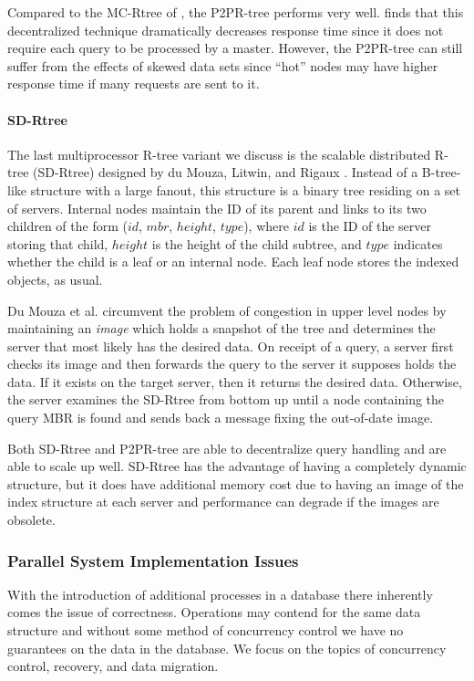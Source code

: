 Compared to the MC-Rtree of \cite{schnitzer1999master}, the P2PR-tree performs
very well. \cite{mondal2005p2pr} finds that this decentralized technique 
dramatically decreases response time since it does
not require each query to be processed by a master. However, the P2PR-tree can
still suffer from the effects of skewed data sets since ``hot'' nodes may have
higher response time if many requests are sent to it. 

\paragraph{SD-Rtree}
The last multiprocessor R-tree variant we discuss is the scalable distributed 
R-tree (SD-Rtree) designed by du Mouza, Litwin, and Rigaux \cite{du2007sd}. 
Instead of a B-tree-like structure with a large
fanout, this structure is a binary tree residing on a set of servers.
Internal nodes maintain the ID of its parent and links to its two children of 
the form ($id$, $mbr$, $height$, $type$), where $id$ is the ID of the server 
storing that child, $height$ is the height of the child subtree, and $type$ 
indicates whether the child is a leaf or an internal node. Each leaf node stores 
the indexed objects, as usual.

Du Mouza et al. \cite{du2007sd} circumvent the problem of congestion in 
upper level nodes by 
maintaining an \emph{image} which holds a snapshot of the tree and determines 
the server that most likely has the desired data. On receipt of a query, a 
server first checks its image and then forwards the query to the server it 
supposes holds the data. If it exists on the target server, then it returns the
desired data. Otherwise, the server examines the SD-Rtree from bottom up until a 
node containing the query MBR is found and sends back a message fixing the 
out-of-date image. %

Both SD-Rtree and P2PR-tree are able to decentralize query handling and are able
to scale up well. SD-Rtree has the advantage of having a completely dynamic 
structure, but it does have additional memory cost due to having an image of the 
index structure at each server and performance can degrade if the images are 
obsolete.

\subsubsection{Parallel System Implementation Issues}
With the introduction of additional processes in a database there inherently
comes the issue of correctness. Operations may contend for the same data 
structure and without some method of concurrency control we have no guarantees
on the data in the database. We focus on the topics of concurrency control, 
recovery, and data migration. 

